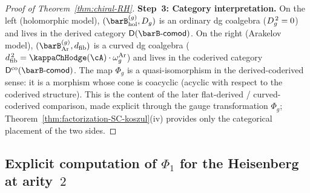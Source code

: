\begin{proof}[Proof of Theorem~\textup{\ref{thm:chiral-RH}}]
\smallskip\noindent
\textbf{Step~3: Category interpretation.}
On the left (holomorphic model), $(\barB^{(g)}_{\mathrm{hol}},\Dg{g})$
is an ordinary dg coalgebra ($D_{g}^{\,2} = 0$) and lives in the
derived category $\mathsf{D}(\barB\text{-}\mathsf{comod})$. On the
right (Arakelov model), $(\barB^{(g)}_{\mathrm{Ar}}, \dfib)$ is a
curved dg coalgebra ($\dfib^{\,2} = \kappaChHodge(\cA) \cdot \omega_g^{\mathrm{Ar}}$) and
lives in the coderived category
$\mathsf{D}^{\mathrm{co}}(\barB\text{-}\mathsf{comod})$. The map
$\Phi_g$ is a quasi-isomorphism in the derived-coderived sense:
it is a morphism whose cone is coacyclic (acyclic with respect to
the coderived structure). This is the content of the
later flat-derived / curved-coderived comparison, made explicit
through the gauge transformation $\Phi_g$; Theorem~\ref{thm:factorization-SC-koszul}(iv)
provides only the categorical placement of the two sides.
\end{proof}

\subsection{Explicit computation of $\Phi_1$ for the Heisenberg
at arity~$2$}
\label{subsec:Phi-1-heisenberg}


